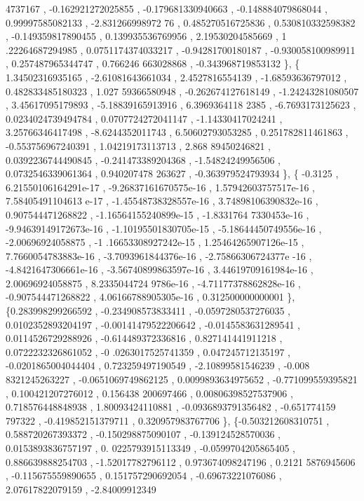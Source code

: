 \begin{DoxyCode}
      4737167 , -0.162921272025855 , -0.179681330940663 , -0.148884079868044 ,  0.99997585082133 , -2.831266998972
      76 , 0.485270516725836 , 0.530810332598382 , -0.149359817890455 , 0.139935536769956 ,  2.19530204585669 ,  1
      .22264687294985 , 0.0751174374033217 , -0.94281700180187 , -0.930058100989911 , 0.257487965344747 , 0.766246
      663028868 , -0.343968719853132 \},
\{ 1.34502316935165 , -2.61081643661034 ,   2.4527816554139 , -1.68593636797012 , 0.482833485180323 ,  1.027
      59366580948 , -0.262674127618149 , -1.24243281080507 ,  3.45617095179893 , -5.18839165913916 ,  6.3969364118
      2385 ,  -6.7693173125623 , 0.0234024739494784 , 0.0707724272041147 , -1.14330417024241 ,  3.25766346417498 ,
        -8.6244352011743 ,  6.50602793053285 , 0.251782811461863 , -0.553756967240391 ,  1.04219173113713 ,  2.868
      89450246821 , 0.0392236744490845 , -0.241473389204368 , -1.54824249956506 , 0.0732546339061364 , 0.940207478
      263627 , -0.363979524793934 \},
\{          -0.3125 , 6.21550106164291e-17 , -9.26837161670575e-16 , 1.57942603757517e-16 , 7.58405491104613
      e-17 , -1.45548738328557e-16 , 3.74898106390832e-16 , 0.907544471268822 , -1.16564155240899e-15 , -1.8331764
      7330453e-16 , -9.94639149172673e-16 , -1.10195501830705e-15 , -5.18644450749556e-16 , -2.00696924058875 , -1
      .16653308927242e-15 , 1.25464265907126e-15 , 7.7660054783883e-16 , -3.7093961844376e-16 , -2.75866306724377e
      -16 , -4.8421647306661e-16 , -3.56740899863597e-16 , 3.44619709161984e-16 ,  2.00696924058875 , 8.2335044724
      9786e-16 , -4.71177378862828e-16 , -0.907544471268822 , 4.06166788905305e-16 , 0.312500000000001 \},
\{0.283998299266592 , -0.234908573833411 , -0.0597280537276035 , 0.0102352893204197 , -0.00141479522206642 ,
       -0.0145583631289541 , 0.0114526729288926 , -0.614489372336816 , 0.827141441911218 , 0.0722232326861052 , -0
      .0263017525741359 , 0.047245712135197 , -0.0201865004044404 , 0.723259497190549 , -2.10899581546239 , -0.008
      8321245263227 , -0.0651069749862125 , 0.0099893634975652 , -0.771099559395821 , 0.100421207276012 , 0.156438
      200697466 , 0.00806398527537906 , 0.718576448848938 ,  1.80093424110881 , -0.0936893791356482 , -0.651774159
      797322 , -0.419852151379711 , 0.320957983767706 \},
\{-0.503212608310751 , 0.588720267393372 , -0.150298875090107 , -0.139124528570036 , 0.0153893836757197 , 0.
      0225793915113349 , -0.0599704205865405 , 0.886639888254703 , -1.52017782796112 , 0.973674098247196 ,  0.2121
      5876945606 , -0.115675559890655 , 0.151757290692054 , -0.69673221076086 ,  2.07617822079159 , -2.84009912349

\end{DoxyCode}
